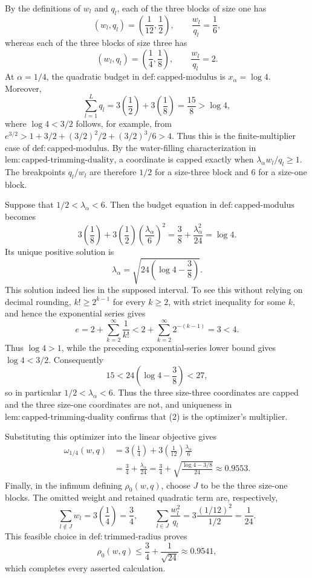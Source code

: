 By the definitions of \(w_l\) and \(q_l\), each of the three blocks of size one has
\[
 (w_l,q_l)=\left(\frac{1}{12},\frac{1}{2}\right),
 \qquad \frac{w_l}{q_l}=\frac{1}{6},
\]
whereas each of the three blocks of size three has
\[
 (w_l,q_l)=\left(\frac{1}{4},\frac{1}{8}\right),
 \qquad \frac{w_l}{q_l}=2.
\tag{1}
\]
At \(\alpha=1/4\), the quadratic budget in \(\mathrm{def{:}capped\text{-}modulus}\) is \(x_\alpha=\log 4\).  Moreover,
\[
 \sum_{l=1}^L q_l=3\left(\frac12\right)+3\left(\frac18\right)=\frac{15}{8}>\log4,
\]
where \(\log4<3/2\) follows, for example, from
\(e^{3/2}>1+3/2+(3/2)^2/2+(3/2)^3/6>4\).
Thus this is the finite-multiplier case of
\(\mathrm{def{:}capped\text{-}modulus}\).  By the water-filling characterization in
\(\mathrm{lem{:}capped\text{-}trimming\text{-}duality}\), a coordinate is capped exactly when
\(\lambda_\alpha w_l/q_l\ge 1\).  The breakpoints \(q_l/w_l\) are therefore \(1/2\) for a size-three block and \(6\) for a size-one block.

Suppose that \(1/2<\lambda_\alpha<6\).  Then the budget equation in
\(\mathrm{def{:}capped\text{-}modulus}\) becomes
\[
 3\left(\frac18\right)
 +3\left(\frac12\right)\left(\frac{\lambda_\alpha}{6}\right)^2
 =\frac38+\frac{\lambda_\alpha^2}{24}
 =\log4.
\]
Its unique positive solution is
\[
 \lambda_\alpha=\sqrt{24\left(\log4-\frac38\right)}.
\tag{2}
\]
This solution indeed lies in the supposed interval.  To see this without relying on decimal rounding, \(k!\ge 2^{k-1}\) for every \(k\ge2\), with strict inequality for some \(k\), and hence the exponential series gives
\[
 e=2+\sum_{k=2}^{\infty}\frac1{k!}
 <2+\sum_{k=2}^{\infty}2^{-(k-1)}=3<4.
\]
Thus \(\log4>1\), while the preceding exponential-series lower bound gives \(\log4<3/2\).  Consequently
\[
 15<24\left(\log4-\frac38\right)<27,
\]
so in particular \(1/2<\lambda_\alpha<6\).  Thus the three size-three coordinates are capped and the three size-one coordinates are not, and uniqueness in
\(\mathrm{lem{:}capped\text{-}trimming\text{-}duality}\) confirms that (2) is the optimizer's multiplier.

Substituting this optimizer into the linear objective gives
\[
 \begin{aligned}
 \omega_{1/4}(w,q)
 &=3\left(\frac14\right)
   +3\left(\frac1{12}\right)\frac{\lambda_\alpha}{6}\\
 &=\frac34+\frac{\lambda_\alpha}{24}
  =\frac34+\sqrt{\frac{\log4-3/8}{24}}
  \approx0.9553.
 \end{aligned}
\tag{3}
\]
Finally, in the infimum defining \(\rho_0(w,q)\), choose \(J\) to be the three size-one blocks.  The omitted weight and retained quadratic term are, respectively,
\[
 \sum_{l\notin J}w_l=3\left(\frac14\right)=\frac34,
 \qquad
 \sum_{l\in J}\frac{w_l^2}{q_l}
 =3\frac{(1/12)^2}{1/2}=\frac1{24}.
\]
This feasible choice in \(\mathrm{def{:}trimmed\text{-}radius}\) proves
\[
 \rho_0(w,q)\le \frac34+\frac1{\sqrt{24}}\approx0.9541,
\]
which completes every asserted calculation.

